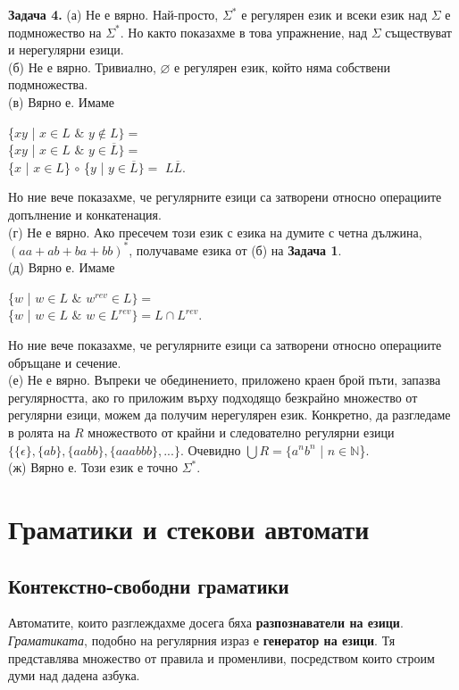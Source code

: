 \documentclass[openany]{book}
\begin{document}
    \textbf{Задача 4.} (а) Не е вярно. Най-просто, $\Sigma^*$ е регулярен език и всеки
    език над $\Sigma$ е подмножество на $\Sigma^*$. Но както показахме в това упражнение,
    над $\Sigma$ съществуват и нерегулярни езици. \\
    (б) Не е вярно. Тривиално, $\varnothing$ е регулярен език, който няма собствени
    подмножества. \\
    (в) Вярно е. Имаме \\
    \begin{center}
        \{$xy$ | $x \in L$ $\&$ $y \notin L\} =$ \\
        \{$xy$ | $x \in L$ $\&$ $y \in \overline{L}\} =$ \\
        \{$x$ | $x \in L$\} $\circ$ \{$y$ | $y \in \overline{L}\} =$ 
        $L\overline{L}$. 
    \end{center}
    Но ние вече показахме, че регулярните езици са затворени относно операциите
    допълнение и конкатенация. \\
    (г) Не е вярно. Ако пресечем този език с езика на думите с четна дължина, $(aa + ab + ba + bb)^*$,
    получаваме езика от (б) на \textbf{Задача 1}. \\
    (д) Вярно е. Имаме \\
    \begin{center}
        \{$w$ | $w \in L$ $\&$ $w^{rev} \in L\} =$ \\
        \{$w$ | $w \in L$ $\&$ $w \in L^{rev}\} = L \cap L^{rev}$.
    \end{center}
    Но ние вече показахме, че регулярните езици са затворени относно операциите
    обръщане и сечение. \\
    (е) Не е вярно. Въпреки че обединението, приложено краен брой пъти, запазва
    регулярността, ако го приложим върху подходящо безкрайно множество от регулярни
    езици, можем да получим нерегулярен език. Конкретно, да разгледаме в ролята на $R$
    множеството от крайни и следователно регулярни езици $\{\{\epsilon\},\{ab\},\{aabb\},\{aaabbb\},...\}$.
    Очевидно $\bigcup R = \{a^nb^n$ | $n \in \mathbb{N}$\}. \\
    (ж) Вярно е. Този език е точно $\Sigma^*$.

    \chapter{Граматики и стекови автомати}

    \section{Контекстно-свободни граматики}
    \hspace{15pt}Автоматите, които разглеждахме досега бяха \textbf{разпознаватели на езици}. 
    \textit{Граматиката}, подобно на регулярния израз е \textbf{генератор на езици}. 
    Тя представлява множество от правила и променливи, посредством които строим думи над дадена азбука. 
\end{document}

